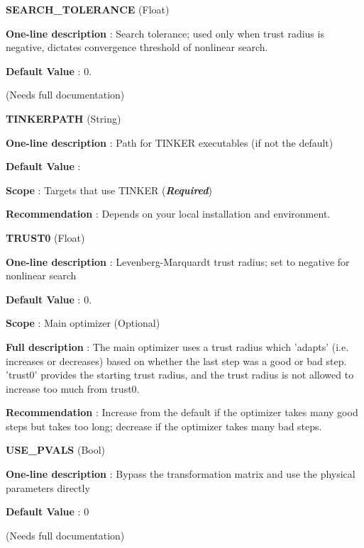 \begin{DoxyItemize}
\item {\bfseries  S\-E\-A\-R\-C\-H\-\_\-\-T\-O\-L\-E\-R\-A\-N\-C\-E } (Float) \par
{\bfseries  One-\/line description }\-: Search tolerance; used only when trust radius is negative, dictates convergence threshold of nonlinear search. \par
{\bfseries  Default Value }\-: 0. \par
(Needs full documentation)\end{DoxyItemize}
\begin{DoxyItemize}
\item {\bfseries  T\-I\-N\-K\-E\-R\-P\-A\-T\-H } (String) \par
{\bfseries  One-\/line description }\-: Path for T\-I\-N\-K\-E\-R executables (if not the default) \par
{\bfseries  Default Value }\-: \par
{\bfseries  Scope }\-: Targets that use T\-I\-N\-K\-E\-R ({\bfseries {\itshape Required}}) \par
{\bfseries  Recommendation }\-: Depends on your local installation and environment.\end{DoxyItemize}
\begin{DoxyItemize}
\item {\bfseries  T\-R\-U\-S\-T0 } (Float) \par
{\bfseries  One-\/line description }\-: Levenberg-\/\-Marquardt trust radius; set to negative for nonlinear search \par
{\bfseries  Default Value }\-: 0. \par
{\bfseries  Scope }\-: Main optimizer (Optional) \par
{\bfseries  Full description }\-: The main optimizer uses a trust radius which 'adapts' (i.\-e. increases or decreases) based on whether the last step was a good or bad step. 'trust0' provides the starting trust radius, and the trust radius is not allowed to increase too much from trust0. \par
{\bfseries  Recommendation }\-: Increase from the default if the optimizer takes many good steps but takes too long; decrease if the optimizer takes many bad steps.\end{DoxyItemize}
\begin{DoxyItemize}
\item {\bfseries  U\-S\-E\-\_\-\-P\-V\-A\-L\-S } (Bool) \par
{\bfseries  One-\/line description }\-: Bypass the transformation matrix and use the physical parameters directly \par
{\bfseries  Default Value }\-: 0 \par
(Needs full documentation)\end{DoxyItemize}
